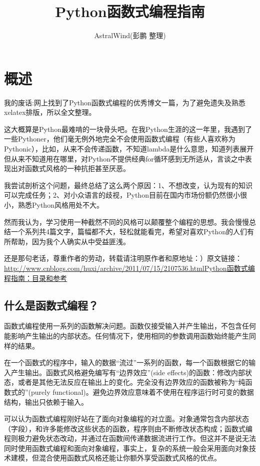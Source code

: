 \documentclass[12pt,a4paper]{report}
\title{Python函数式编程指南}
\author{AstralWind(彭鹏 整理)}
\begin{document}
\maketitle
\tableofcontents
\newpage

\chapter{概述}
我的废话:网上找到了Python函数式编程的优秀博文一篇，为了避免遗失及熟悉xelatex排版，所以全文整理。

这大概算是Python最难啃的一块骨头吧。在我Python生涯的这一年里，我遇到了一些Pythoner，他们毫无例外地完全不会使用函数式编程（有些人喜欢称为Pythonic），比如，从来不会传递函数，不知道lambda是什么意思，知道列表展开但从来不知道用在哪里，对Python不提供经典for循环感到无所适从，言谈之中表现出对函数式风格的一种抗拒甚至厌恶。 

我尝试剖析这个问题，最终总结了这么两个原因：1、不想改变，认为现有的知识可以完成任务；2、对小众语言的歧视，Python目前在国内市场份额仍然很小很小，熟悉Python风格用处不大。 

然而我认为，学习使用一种截然不同的风格可以颠覆整个编程的思想。我会慢慢总结一个系列共4篇文字，篇幅都不大，轻松就能看完，希望对喜欢Python的人们有所帮助，因为我个人确实从中受益匪浅。 

还是那句老话，尊重作者的劳动，转载请注明原作者和原地址：）原文链接：\url{http://www.cnblogs.com/huxi/archive/2011/07/15/2107536.html}\href{http://www.cnblogs.com/huxi/archive/2011/07/15/2107536.html}{Python函数式编程指南：目录和参考}
\section{什么是函数式编程？} 
函数式编程使用一系列的函数解决问题。函数仅接受输入并产生输出，不包含任何能影响产生输出的内部状态。任何情况下，使用相同的参数调用函数始终能产生同样的结果。

在一个函数式的程序中，输入的数据“流过”一系列的函数，每一个函数根据它的输入产生输出。函数式风格避免编写有“边界效应”(side effects)的函数：修改内部状态，或者是其他无法反应在输出上的变化。完全没有边界效应的函数被称为“纯函数式的”(purely functional)。避免边界效应意味着不使用在程序运行时可变的数据结构，输出只依赖于输入。

可以认为函数式编程刚好站在了面向对象编程的对立面。对象通常包含内部状态（字段），和许多能修改这些状态的函数，程序则由不断修改状态构成；函数式编程则极力避免状态改动，并通过在函数间传递数据流进行工作。但这并不是说无法同时使用函数式编程和面向对象编程，事实上，复杂的系统一般会采用面向对象技术建模，但混合使用函数式风格还能让你额外享受函数式风格的优点。
\end{document}
